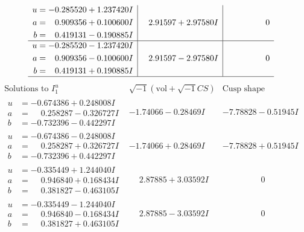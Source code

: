 \documentclass[1p]{elsarticle_modified}
\theoremstyle{definition}
\newcommand{\I}{\sqrt{-1}}
\begin{document}
$$\begin{array}{c|c|c}
\begin{aligned}
u &= -0.285520 + 1.237420 I \\
a &= \phantom{-}0.909356 + 0.100600 I \\
b &= \phantom{-}0.419131 - 0.190885 I\end{aligned}
 & \phantom{-}2.91597 + 2.97580 I & \phantom{-0.000000 } 0 \\ \hline\begin{aligned}
u &= -0.285520 - 1.237420 I \\
a &= \phantom{-}0.909356 - 0.100600 I \\
b &= \phantom{-}0.419131 + 0.190885 I\end{aligned}
 & \phantom{-}2.91597 - 2.97580 I & \phantom{-0.000000 } 0\\
 \hline 
 \end{array}$$\newpage$$\begin{array}{c|c|c}  
\text{Solutions to }I^u_{1}& \I (\text{vol} + \sqrt{-1}CS) & \text{Cusp shape}\\
 \hline 
\begin{aligned}
u &= -0.674386 + 0.248008 I \\
a &= \phantom{-}0.258287 - 0.326727 I \\
b &= -0.732396 - 0.442297 I\end{aligned}
 & -1.74066 - 0.28469 I & -7.78828 - 0.51945 I \\ \hline\begin{aligned}
u &= -0.674386 - 0.248008 I \\
a &= \phantom{-}0.258287 + 0.326727 I \\
b &= -0.732396 + 0.442297 I\end{aligned}
 & -1.74066 + 0.28469 I & -7.78828 + 0.51945 I \\ \hline\begin{aligned}
u &= -0.335449 + 1.244040 I \\
a &= \phantom{-}0.946840 + 0.168434 I \\
b &= \phantom{-}0.381827 - 0.463105 I\end{aligned}
 & \phantom{-}2.87885 + 3.03592 I & \phantom{-0.000000 } 0 \\ \hline\begin{aligned}
u &= -0.335449 - 1.244040 I \\
a &= \phantom{-}0.946840 - 0.168434 I \\
b &= \phantom{-}0.381827 + 0.463105 I\end{aligned}
 & \phantom{-}2.87885 - 3.03592 I & \phantom{-0.000000 } 0 \\ \hline\begin{aligned}

\end{aligned}
\end{array}$$
\end{document}
